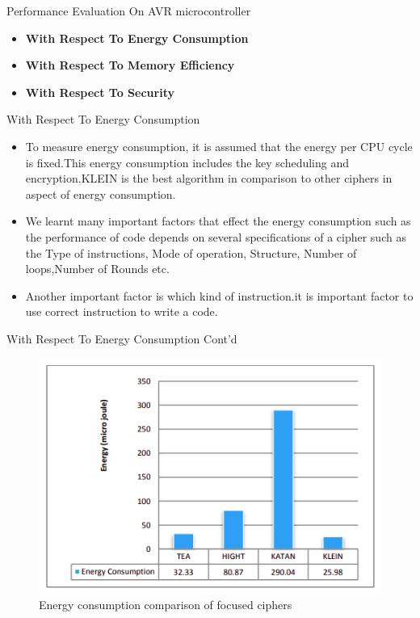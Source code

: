 \begin{frame}{Performance Evaluation On AVR microcontroller}
	\begin{itemize}
		\item \textbf {With Respect To Energy Consumption}
		\item \textbf {With Respect To Memory Efficiency}
		\item \textbf {With Respect To Security}
	\end{itemize}
\end{frame}

\begin{frame}{With Respect To Energy Consumption}
	\begin{itemize}
		\item To measure energy consumption, it is assumed that the energy per CPU cycle is fixed.This energy consumption includes the key scheduling and encryption.KLEIN is the best algorithm in comparison to other ciphers in aspect of energy consumption.
		\item We learnt many important factors that effect the energy consumption such as the performance of code depends on several specifications of a cipher such as the Type of instructions, Mode of operation, Structure, Number of loops,Number of Rounds etc.
		\item Another important factor is which kind of instruction.it is important factor to use correct instruction to write a code.
	\end{itemize}
\end{frame}

\begin{frame}{With Respect To Energy Consumption Cont'd}
	\begin{itemize}
    \begin{figure}
    \centering
    \includegraphics[width= 75 mm]{Pics/EC.png} 
    \caption{Energy consumption comparison of focused ciphers}
    \label{fig:6distinguisher}
\end{figure} 
	\end{itemize}
\end{frame}

